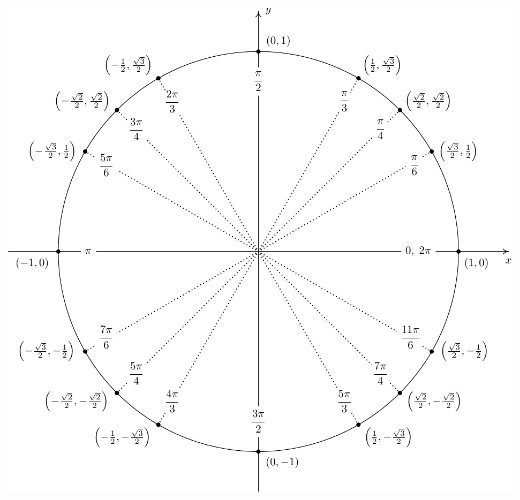 \documentclass[12pt]{article}
\begin{document}
\begin{center}
 \includegraphics[scale=0.75]{UnitCircle}
\end{center}
\newpage
\end{document}
